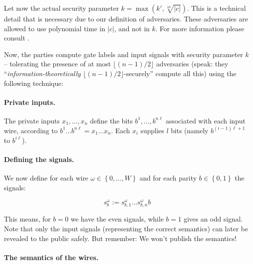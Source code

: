 \message{ !name(seminar.tex)}\documentclass{llncs}
\begin{document}

Let now the actual security parameter $k=\max(k',\sqrt[10]{|c|})$. This is a technical detail that is necessary due to our definition of adversaries. These adversaries are allowed to use polynomial time in $|c|$, and not in $k$. For more information please consult \cite{Rogaway:1991:RCS:888502}.

Now, the parties compute gate labels and input signals with security parameter $k$ -- tolerating the presence of at most $\lfloor \left( n-1 \right) / 2\rfloor$ adversaries (speak: they ``\emph{information-theo\-retically} $\lfloor (n-1)/2 \rfloor$-securely'' compute all this) using the following technique:

\paragraph{Private inputs.}

The private inputs $x_1,\dots,x_n$ define the bits $b^1,\dots,b^{n\ell}$ associated with each input wire, according to $b^1\dots b^{n\ell}=x_1\dots x_n$. Each $x_i$ supplies $l$ bits (namely $b^{(i-1)\ell+1}$ to $b^{i\ell}$).

\paragraph{Defining the signals.}

We now define for each wire $\omega\in\left\{ 0,\dots,W \right\}$ and for each parity $b\in\left\{ 0,1 \right\}$ the signals:

\begin{equation}
  \label{eq:definition-of-signals}
  s_b^\omega:=s_{b,1}^\omega\dots s_{b,n}^\omega b
\end{equation}

This means, for $b=0$ we have the even signals, while $b=1$ gives an odd signal. Note that only the input signals (representing the correct semantics) can later be revealed to the public safely. But remember: We won't publish the semantics!

\paragraph{The semantics of the wires.}
\end{document}
